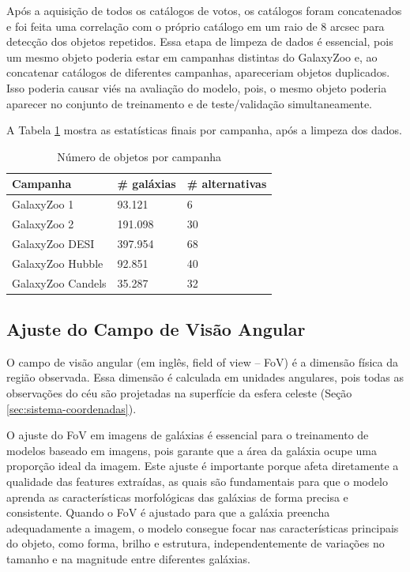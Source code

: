 Após a aquisição de todos os catálogos de votos, os catálogos foram concatenados e foi feita uma correlação com o próprio catálogo em um raio de 8 arcsec para detecção dos objetos repetidos. Essa etapa de limpeza de dados é essencial, pois um mesmo objeto poderia estar em campanhas distintas do GalaxyZoo e, ao concatenar catálogos de diferentes campanhas, apareceriam objetos duplicados. Isso poderia causar viés na avaliação do modelo, pois, o mesmo objeto poderia aparecer no conjunto de treinamento e de teste/validação simultaneamente.

A Tabela \ref{tab:gz} mostra as estatísticas finais por campanha, após a limpeza dos dados.

\begin{table}[htbp]
  \centering
  \caption{Número de objetos por campanha}
  \label{tab:gz}
  \begin{tabular}{lll}\toprule
    Campanha          & \# galáxias & \# alternativas \\\hline
    GalaxyZoo 1       & 93.121      & 6               \\
    GalaxyZoo 2       & 191.098     & 30              \\
    GalaxyZoo DESI    & 397.954     & 68              \\
    GalaxyZoo Hubble  & 92.851      & 40              \\
    GalaxyZoo Candels & 35.287      & 32              \\
    \bottomrule
  \end{tabular}
\end{table}



\subsection{Ajuste do Campo de Visão Angular}
\label{sec:aquisicao-fov}

O campo de visão angular (em inglês, field of view -- FoV) é a dimensão física da região observada. Essa dimensão é calculada em unidades angulares, pois todas as observações do céu são projetadas na superfície da esfera celeste (Seção \ref{sec:sistema-coordenadas}).

O ajuste do FoV em imagens de galáxias é essencial para o treinamento de modelos baseado em imagens, pois garante que a área da galáxia ocupe uma proporção ideal da imagem. Este ajuste é importante porque afeta diretamente a qualidade das features extraídas, as quais são fundamentais para que o modelo aprenda as características morfológicas das galáxias de forma precisa e consistente. Quando o FoV é ajustado para que a galáxia preencha adequadamente a imagem, o modelo consegue focar nas características principais do objeto, como forma, brilho e estrutura, independentemente de variações no tamanho e na magnitude entre diferentes galáxias.

